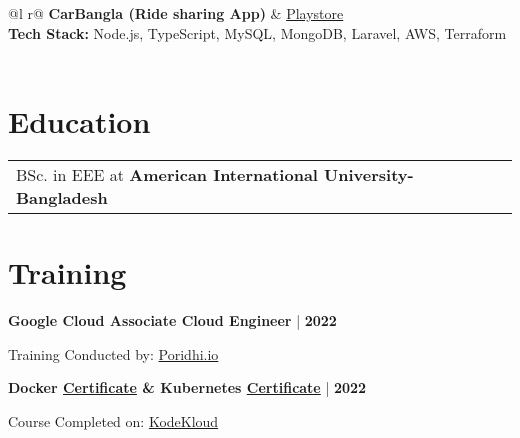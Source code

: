 \documentclass {article}
\begin{document}
\begin{tabularx}{\linewidth}{ @{}l r@{} }
    \Large\textbf{CarBangla (Ride sharing App)} & \hfill \href{https://play.google.com/store/apps/details?id=com.carbangla.user\&hl=en\&gl=US\&pli=1} {Playstore} \\[3.75pt]  
    \textbf{Tech Stack:} Node.js, TypeScript, MySQL, MongoDB, Laravel, AWS, Terraform\\[3.75pt]
      \\
    \newline
\end{tabularx}


\section{Education}
\begin{tabularx}{\linewidth}{@{}l X@{}}	
BSc. in EEE at \textbf{American International University-Bangladesh} \hfill \normalsize \\
\end{tabularx}

\section{Training}

    \begin{minipage}[t]{0.7\textwidth}
        \large \textbf{Google Cloud Associate Cloud Engineer} | \textbf{2022}
    \end{minipage}

    \begin{minipage}[t]{0.5\textwidth}
         Training Conducted by: \href{https://poridhi.io/}{Poridhi.io} 
    \end{minipage}

    \begin{minipage}[t]{0.7\textwidth}
         \large \textbf{Docker \href{https://kodekloud.com/certificate-verification/73614B2C60-735B546104-735B181BB8/}{Certificate} \& Kubernetes \href{https://kodekloud.com/certificate-verification/73614B2C60-735B5486E3-735B181BB8/}{Certificate}} | \textbf{2022}
    \end{minipage}

    \begin{minipage}[t]{0.5\textwidth}
         Course Completed on: \href{https://kodekloud.com/}{KodeKloud}
    \end{minipage}
    
\end{document}
